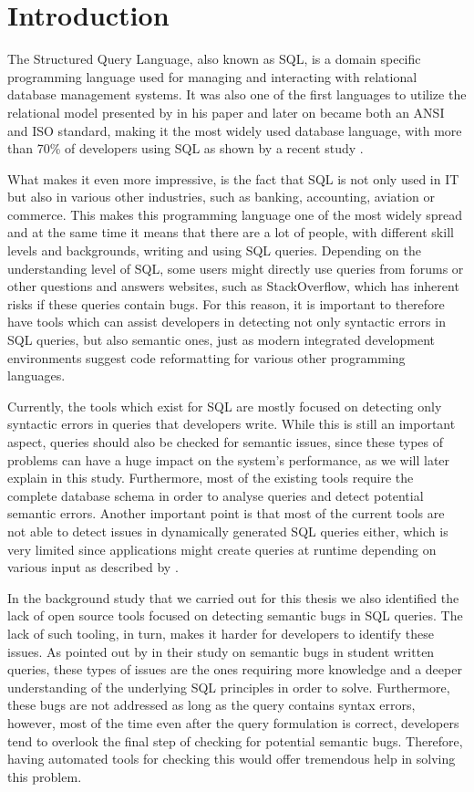 \chapter{Introduction}
\label{chapter:introduction}

The Structured Query Language, also known as SQL, is a domain specific programming language used for managing and interacting with relational database management systems. It was also one of the first languages to utilize the relational model presented by \citet{P000} in his paper and later on became both an ANSI and ISO standard, making it the most widely used database language, with more than 70\% of developers using SQL as shown by a recent study \cite{P999}. 

What makes it even more impressive, is the fact that SQL is not only used in IT but also in various other industries, such as banking, accounting, aviation or commerce. This makes this programming language one of the most widely spread and at the same time it means that there are a lot of people, with different skill levels and backgrounds, writing and using SQL queries. Depending on the understanding level of SQL, some users might directly use queries from forums or other questions and answers websites, such as StackOverflow, which has inherent risks if these queries contain bugs. For this reason, it is important to therefore have tools which can assist developers in detecting not only syntactic errors in SQL queries, but also semantic ones, just as modern integrated development environments suggest code reformatting for various other programming languages. 

Currently, the tools which exist for SQL are mostly focused on detecting only syntactic errors in queries that developers write. While this is still an important aspect, queries should also be checked for semantic issues, since these types of problems can have a huge impact on the system's performance, as we will later explain in this study. Furthermore, most of the existing tools require the complete database schema in order to analyse queries and detect potential semantic errors. Another important point is that most of the current tools are not able to detect issues in dynamically generated SQL queries either, which is very limited since applications might create queries at runtime depending on various input as described by \citet{P007}.

In the background study that we carried out for this thesis we also identified the lack of open source tools focused on detecting semantic bugs in SQL queries. The lack of such tooling, in turn, makes it harder for developers to identify these issues. As pointed out by \citet{P008} in their study on semantic bugs in student written queries, these types of issues are the ones requiring more knowledge and a deeper understanding of the underlying SQL principles in order to solve. Furthermore, these bugs are not addressed as long as the query contains syntax errors, however, most of the time even after the query formulation is correct, developers tend to overlook the final step of checking for potential semantic bugs. Therefore, having automated tools for checking this would offer tremendous help in solving this problem.

